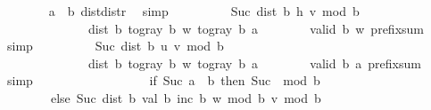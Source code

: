 \begin{isabellebody}
\ \ \ \ \ \ \isamarkupfalse%
\ {\isacartoucheopen}a\ {\isacharless}{\kern0pt}\ b{\isacartoucheclose}\ dist{}{\isacharunderscore}{\kern0pt}distr{}\ \isamarkupfalse%
\ simp\isanewline
\ \ \ \ \isamarkupfalse%
\ \isamarkupfalse%
\ {\isachardoublequoteopen}{\isachardot}{\kern0pt}{\isachardot}{\kern0pt}{\isachardot}{\kern0pt}\ {\isacharequal}{\kern0pt}\ Suc\ {\isacharparenleft}{\kern0pt}dist{}\ b\ {\isacharquery}{\kern0pt}h\ {\isacharquery}{\kern0pt}v{\isacharparenright}{\kern0pt}\ mod\ b\isanewline
\ \ \ \ \ \ \ \ \ \ \ \ \ {\isacharplus}{\kern0pt}\ dist\ b\ {\isacharparenleft}{\kern0pt}to{\isacharunderscore}{\kern0pt}gray\ b\ w{\isacharparenright}{\kern0pt}\ {\isacharparenleft}{\kern0pt}to{\isacharunderscore}{\kern0pt}gray\ b\ {\isacharquery}{\kern0pt}a{\isacharparenright}{\kern0pt}{\isachardoublequoteclose}\isanewline
\ \ \ \ \ \ \isamarkupfalse%
\ {\isacartoucheopen}valid\ b\ w{\isacartoucheclose}\ prefix{\isacharunderscore}{\kern0pt}sum\ \isamarkupfalse%
\ simp\isanewline
\ \ \ \ \isamarkupfalse%
\ \isamarkupfalse%
\ {\isachardoublequoteopen}{\isachardot}{\kern0pt}{\isachardot}{\kern0pt}{\isachardot}{\kern0pt}\ {\isacharequal}{\kern0pt}\ Suc\ {\isacharparenleft}{\kern0pt}dist{}\ b\ {\isacharquery}{\kern0pt}u\ {\isacharquery}{\kern0pt}v{\isacharparenright}{\kern0pt}\ mod\ b\isanewline
\ \ \ \ \ \ \ \ \ \ \ \ \ {\isacharplus}{\kern0pt}\ dist\ b\ {\isacharparenleft}{\kern0pt}to{\isacharunderscore}{\kern0pt}gray\ b\ w{\isacharparenright}{\kern0pt}\ {\isacharparenleft}{\kern0pt}to{\isacharunderscore}{\kern0pt}gray\ b\ {\isacharquery}{\kern0pt}a{\isacharparenright}{\kern0pt}{\isachardoublequoteclose}\isanewline
\ \ \ \ \ \ \isamarkupfalse%
\ {\isacartoucheopen}valid\ b\ {\isacharquery}{\kern0pt}a{\isacartoucheclose}\ prefix{\isacharunderscore}{\kern0pt}sum\ \isamarkupfalse%
\ simp\isanewline
\ \ \ \ \isamarkupfalse%
\ \isamarkupfalse%
\ {\isachardoublequoteopen}{\isachardot}{\kern0pt}{\isachardot}{\kern0pt}{\isachardot}{\kern0pt}\ {\isacharequal}{\kern0pt}\ {\isacharparenleft}{\kern0pt}\isanewline
\ \ \ \ \ \ \ \ if\ Suc\ a\ {\isasymnoteq}\ b\ then\ Suc\ {}\ mod\ b\isanewline
\ \ \ \ \ \ \ \ else\ Suc\ {\isacharparenleft}{\kern0pt}dist{}\ b\ {\isacharparenleft}{\kern0pt}val\ b\ {\isacharparenleft}{\kern0pt}inc\ b\ w{\isacharparenright}{\kern0pt}\ mod\ b{\isacharparenright}{\kern0pt}\ {\isacharquery}{\kern0pt}v{\isacharparenright}{\kern0pt}\ mod\ b\isanewline

\end{isabellebody}
